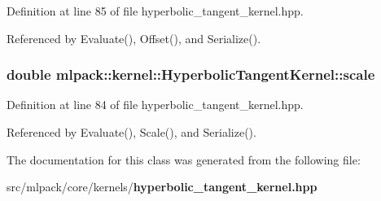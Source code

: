 Definition at line 85 of file hyperbolic\+\_\+tangent\+\_\+kernel.\+hpp.



Referenced by Evaluate(), Offset(), and Serialize().

\subsubsection[{scale}]{\setlength{\rightskip}{0pt plus 5cm}double mlpack\+::kernel\+::\+Hyperbolic\+Tangent\+Kernel\+::scale\hspace{0.3cm}{\ttfamily [private]}}\label{classmlpack_1_1kernel_1_1HyperbolicTangentKernel_ac7fc2bb9399ec5ebbbf1b45f5eb14f44}


Definition at line 84 of file hyperbolic\+\_\+tangent\+\_\+kernel.\+hpp.



Referenced by Evaluate(), Scale(), and Serialize().



The documentation for this class was generated from the following file\+:\begin{DoxyCompactItemize}
\item 
src/mlpack/core/kernels/{\bf hyperbolic\+\_\+tangent\+\_\+kernel.\+hpp}\end{DoxyCompactItemize}

